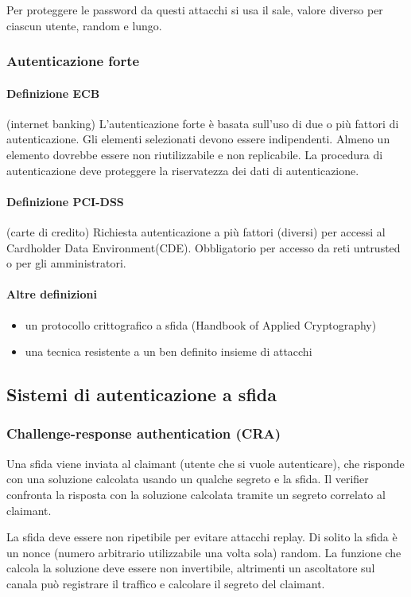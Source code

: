 \documentclass[11pt]{article}
\begin{document}
Per proteggere le password da questi attacchi si usa il sale, valore diverso per ciascun utente, random e lungo. 
\subsubsection{Autenticazione forte}
\paragraph*{Definizione ECB}
(internet banking) L'autenticazione forte è basata sull'uso di due o più fattori di autenticazione. Gli elementi selezionati devono essere 
indipendenti. Almeno un elemento dovrebbe essere non riutilizzabile e non replicabile. La procedura di autenticazione deve
proteggere la riservatezza dei dati di autenticazione.
\paragraph*{Definizione PCI-DSS}
(carte di credito) Richiesta autenticazione a più fattori (diversi) per accessi al Cardholder Data Environment(CDE). Obbligatorio per accesso 
da reti untrusted o per gli amministratori.
\paragraph*{Altre definizioni}
\begin{itemize}
    \item un protocollo crittografico a sfida (Handbook of Applied Cryptography)
    \item una tecnica resistente a un ben definito insieme di attacchi 
\end{itemize}
\subsection{Sistemi di autenticazione a sfida}
\subsubsection{Challenge-response authentication (CRA)}
Una sfida viene inviata al claimant (utente che si vuole autenticare), che risponde con una soluzione calcolata usando un 
qualche segreto e la sfida. Il verifier confronta la risposta con la soluzione calcolata tramite un segreto correlato al 
claimant.

La sfida deve essere non ripetibile per evitare attacchi replay. Di solito la sfida è un nonce (numero arbitrario utilizzabile 
una volta sola) random. La funzione che calcola la soluzione deve essere non invertibile, altrimenti un ascoltatore sul canala può registrare il traffico e calcolare il 
segreto del claimant. 
\end{document}
